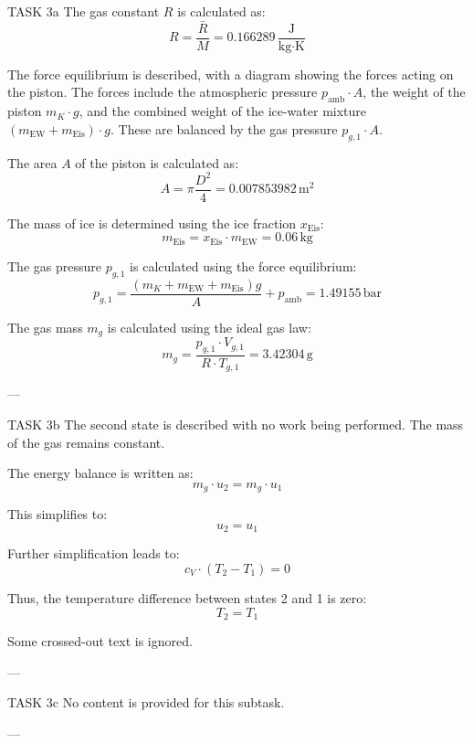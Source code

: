 TASK 3a  
The gas constant \( R \) is calculated as:  
\[
R = \frac{\bar{R}}{M} = 0.166289 \, \frac{\text{J}}{\text{kg·K}}
\]

The force equilibrium is described, with a diagram showing the forces acting on the piston. The forces include the atmospheric pressure \( p_{\text{amb}} \cdot A \), the weight of the piston \( m_K \cdot g \), and the combined weight of the ice-water mixture \( (m_{\text{EW}} + m_{\text{Eis}}) \cdot g \). These are balanced by the gas pressure \( p_{g,1} \cdot A \).  

The area \( A \) of the piston is calculated as:  
\[
A = \pi \frac{D^2}{4} = 0.007853982 \, \text{m}^2
\]

The mass of ice is determined using the ice fraction \( x_{\text{Eis}} \):  
\[
m_{\text{Eis}} = x_{\text{Eis}} \cdot m_{\text{EW}} = 0.06 \, \text{kg}
\]

The gas pressure \( p_{g,1} \) is calculated using the force equilibrium:  
\[
p_{g,1} = \frac{(m_K + m_{\text{EW}} + m_{\text{Eis}}) g}{A} + p_{\text{amb}} = 1.49155 \, \text{bar}
\]

The gas mass \( m_g \) is calculated using the ideal gas law:  
\[
m_g = \frac{p_{g,1} \cdot V_{g,1}}{R \cdot T_{g,1}} = 3.42304 \, \text{g}
\]

---

TASK 3b  
The second state is described with no work being performed. The mass of the gas remains constant.  

The energy balance is written as:  
\[
m_g \cdot u_2 = m_g \cdot u_1
\]

This simplifies to:  
\[
u_2 = u_1
\]

Further simplification leads to:  
\[
c_V \cdot (T_2 - T_1) = 0
\]

Thus, the temperature difference between states 2 and 1 is zero:  
\[
T_2 = T_1
\]  

Some crossed-out text is ignored.  

---

TASK 3c  
No content is provided for this subtask.  

---  
